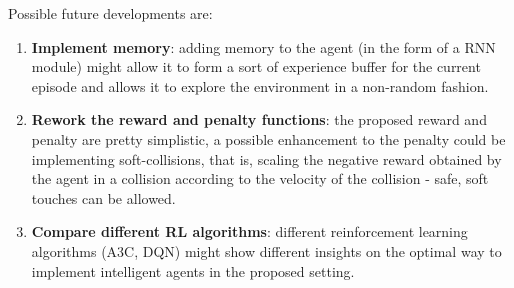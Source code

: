 \documentclass{ifacconf}
\begin{document}
Possible future developments are:
\begin{enumerate}
    \item \textbf{Implement memory}: adding memory to the agent (in the form of a RNN module) might allow it to form a sort of experience buffer for the current episode and allows it to explore the environment in a non-random fashion.
    \item \textbf{Rework the reward and penalty functions}: the proposed reward and penalty are pretty simplistic, a possible enhancement to the penalty could be implementing soft-collisions, that is, scaling the negative reward obtained by the agent in a collision according to the velocity of the collision - safe, soft touches can be allowed.
    \item \textbf{Compare different RL algorithms}: different reinforcement learning algorithms (A3C, DQN) might show different insights on the optimal way to implement intelligent agents in the proposed setting.
\end{enumerate}



\end{document}
